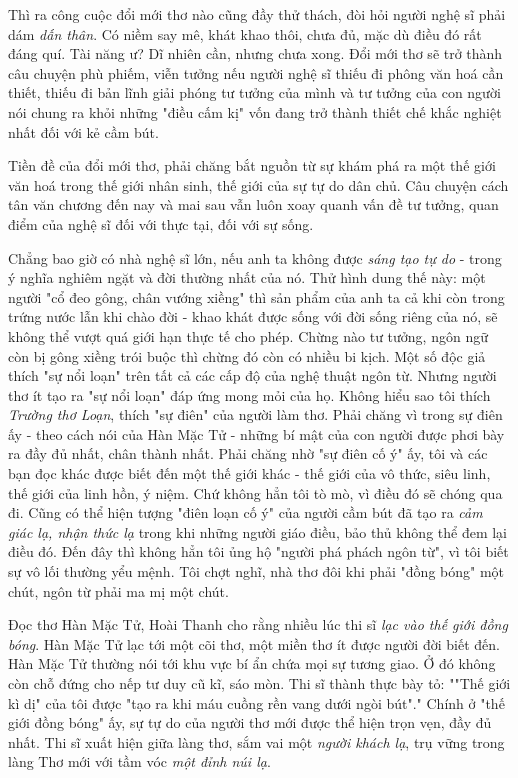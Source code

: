 \documentclass[../main.tex]{subfiles}
\begin{document}
\begin{multicols}{2}
Thì ra công cuộc đổi mới thơ nào cũng đầy thử thách, đòi hỏi người nghệ sĩ phải dám \textit{dấn thân}. Có niềm say mê, khát khao thôi, chưa đủ, mặc dù điều đó rất đáng quí. Tài năng ư? Dĩ nhiên cần, nhưng chưa xong. Đổi mới thơ sẽ trở thành câu chuyện phù phiếm, viễn tưởng nếu người nghệ sĩ thiếu đi phông văn hoá cần thiết, thiếu đi bản lĩnh giải phóng tư tưởng của mình và tư tưởng của con người nói chung ra khỏi những "điều cấm kị" vốn đang trở thành thiết chế khắc nghiệt nhất đối với kẻ cầm bút. 
 
Tiền đề của đổi mới thơ, phải chăng bắt nguồn từ sự khám phá ra một thế giới văn hoá trong thế giới nhân sinh, thế giới của sự tự do dân chủ. Câu chuyện cách tân văn chương đến nay và mai sau vẫn luôn xoay quanh vấn đề tư tưởng, quan điểm của nghệ sĩ đối với thực tại, đối với sự sống.  
 
Chẳng bao giờ có nhà nghệ sĩ lớn, nếu anh ta không được \textit{sáng tạo tự do} - trong ý nghĩa nghiêm ngặt và đời thường nhất của nó. Thử hình dung thế này: một người "cổ đeo gông, chân vướng xiềng" thì sản phẩm của anh ta cả khi còn trong trứng nước lẫn khi chào đời - khao khát được sống với đời sống riêng của nó, sẽ không thể vượt quá giới hạn thực tế cho phép. Chừng nào tư tưởng, ngôn ngữ còn bị gông xiềng trói buộc thì chừng đó còn có nhiều bi kịch. Một số độc giả thích "sự nổi loạn" trên tất cả các cấp độ của nghệ thuật ngôn từ. Nhưng người thơ ít tạo ra "sự nổi loạn" đáp ứng mong mỏi của họ. Không hiểu sao tôi thích \textit{Trường thơ Loạn}, thích "sự điên" của người làm thơ. Phải chăng vì trong sự điên ấy - theo cách nói của Hàn Mặc Tử - những bí mật của con người được phơi bày ra đầy đủ nhất, chân thành nhất. Phải chăng nhờ "sự điên cố ý" ấy, tôi và các bạn đọc khác được biết đến một thế giới khác - thế giới của vô thức, siêu linh, thế giới của linh hồn, ý niệm. Chứ không hẳn tôi tò mò, vì điều đó sẽ chóng qua đi. Cũng có thể hiện tượng "điên loạn cố ý" của người cầm bút đã tạo ra \textit{cảm giác lạ, nhận thức lạ} trong khi những người giáo điều, bảo thủ không thể đem lại điều đó. Đến đây thì không hẳn tôi ủng hộ "người phá phách ngôn từ", vì tôi biết sự vô lối thường yểu mệnh. Tôi chợt nghĩ, nhà thơ đôi khi phải "đồng bóng" một chút, ngôn từ phải ma mị một chút. 
  
Đọc thơ Hàn Mặc Tử, Hoài Thanh cho rằng nhiều lúc thi sĩ \textit{lạc vào thế giới đồng bóng}. Hàn Mặc Tử  lạc tới một cõi thơ, một miền thơ ít được người đời biết đến. Hàn Mặc Tử thường nói tới khu vực bí ẩn  chứa mọi sự tương giao. Ở đó không còn chỗ đứng cho nếp tư duy cũ kĩ, sáo mòn. Thi sĩ thành thực bày tỏ: ""Thế giới kì dị" của tôi được "tạo ra khi máu cuồng rền vang dưới ngòi bút"." Chính ở "thế giới đồng bóng" ấy, sự tự do của người thơ mới được thể hiện trọn vẹn, đầy đủ nhất. Thi sĩ xuất hiện giữa làng thơ, sắm vai một \textit{người khách lạ}, trụ vững trong làng Thơ mới với tầm vóc \textit{một đỉnh núi lạ}.  
 

\end{multicols}
\end{document}
